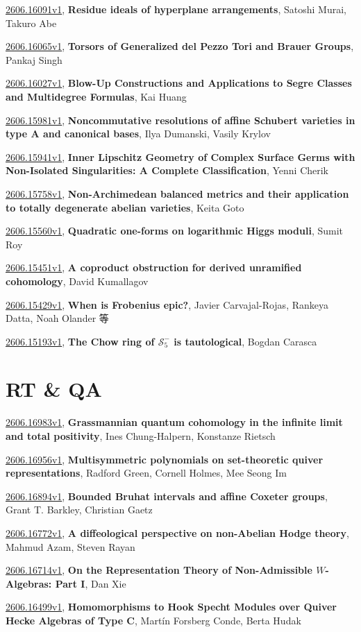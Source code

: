 \documentclass[9pt, a4paper]{article}
\theoremstyle{plain}
\theoremstyle{definition}
\theoremstyle{remark}
\newcommand{\arxiv}[3]{\href{https://arxiv.org/abs/#1}{#1}, \textbf{\textcolor{arxivblue}{#2}}, #3}
\begin{document}
\arxiv{2606.16091v1}{Residue ideals of hyperplane arrangements}{Satoshi Murai, Takuro Abe}

\arxiv{2606.16065v1}{Torsors of Generalized del Pezzo Tori and Brauer Groups}{Pankaj Singh}

\arxiv{2606.16027v1}{Blow-Up Constructions and Applications to Segre Classes and Multidegree Formulas}{Kai Huang}

\arxiv{2606.15981v1}{Noncommutative resolutions of affine Schubert varieties in type A and canonical bases}{Ilya Dumanski, Vasily Krylov}

\arxiv{2606.15941v1}{Inner Lipschitz Geometry of Complex Surface Germs with Non-Isolated Singularities: A Complete Classification}{Yenni Cherik}

\arxiv{2606.15758v1}{Non-Archimedean balanced metrics and their application to totally degenerate abelian varieties}{Keita Goto}

\arxiv{2606.15560v1}{Quadratic one-forms on logarithmic Higgs moduli}{Sumit Roy}

\arxiv{2606.15451v1}{A coproduct obstruction for derived unramified cohomology}{David Kumallagov}

\arxiv{2606.15429v1}{When is Frobenius epic?}{Javier Carvajal-Rojas, Rankeya Datta, Noah Olander 等}

\arxiv{2606.15193v1}{The Chow ring of $\mathcal{S}_5^-$ is tautological}{Bogdan Carasca}


\section{RT \& QA}
\arxiv{2606.16983v1}{Grassmannian quantum cohomology in the infinite limit and total positivity}{Ines Chung-Halpern, Konstanze Rietsch}

\arxiv{2606.16956v1}{Multisymmetric polynomials on set-theoretic quiver representations}{Radford Green, Cornell Holmes, Mee Seong Im}

\arxiv{2606.16894v1}{Bounded Bruhat intervals and affine Coxeter groups}{Grant T. Barkley, Christian Gaetz}

\arxiv{2606.16772v1}{A diffeological perspective on non-Abelian Hodge theory}{Mahmud Azam, Steven Rayan}

\arxiv{2606.16714v1}{On the Representation Theory of Non-Admissible $W$-Algebras: Part I}{Dan Xie}

\arxiv{2606.16499v1}{Homomorphisms to Hook Specht Modules over Quiver Hecke Algebras of Type C}{Martín Forsberg Conde, Berta Hudak}
\end{document}
